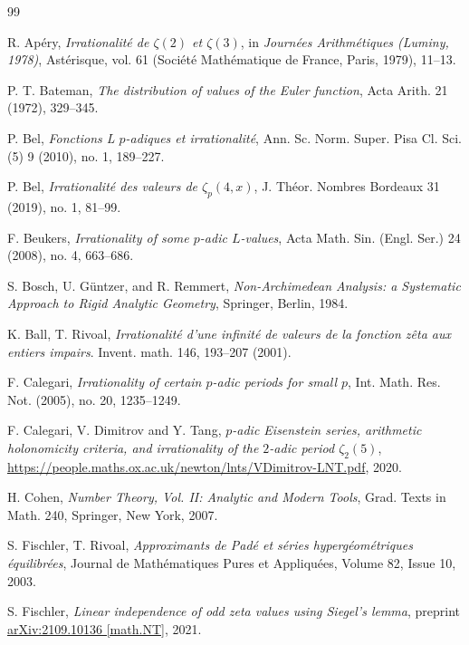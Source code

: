 \documentclass[12pt]{article}
\numberwithin{equation}{section}
\begin{document}
\begin{thebibliography}{99}

 R. Ap{\'e}ry, \textit{Irrationalit{\'e} de $\zeta(2)$ et $\zeta(3)$}, in \textit{Journ{\'e}es Arithm{\'e}tiques (Luminy, 1978)}, Ast{\'e}risque, vol. 61 (Soci{\'e}t{\'e} Math{\'e}matique de France, Paris, 1979), 11--13.

 P. T. Bateman, \textit{The distribution of values of the Euler function}, Acta Arith. 21 (1972), 329--345.

 P. Bel, \textit{Fonctions L $p$-adiques et irrationalit{\'e}}, Ann. Sc. Norm. Super. Pisa Cl. Sci. (5) 9 (2010), no. 1, 189--227.

 P. Bel, \textit{Irrationalit{\'e} des valeurs de $\zeta_p(4,x)$}, J. Th{\'e}or. Nombres Bordeaux 31 (2019), no. 1, 81--99.

 F. Beukers, \textit{Irrationality of some $p$-adic $L$-values}, Acta Math. Sin. (Engl. Ser.) 24 (2008), no. 4, 663--686.

 S. Bosch, U. G{\"u}ntzer, and R. Remmert, \textit{Non-Archimedean Analysis: a Systematic Approach to Rigid Analytic Geometry}, Springer, Berlin, 1984.

 K. Ball, T. Rivoal, \textit{Irrationalité d’une infinité de valeurs de la fonction zêta aux entiers impairs}. Invent. math. 146, 193–207 (2001).

 F. Calegari, \textit{Irrationality of certain $p$-adic periods for small $p$}, Int. Math. Res. Not. (2005), no. 20, 1235--1249.

 F. Calegari, V. Dimitrov and Y. Tang, \textit{$p$-adic Eisenstein series, arithmetic holonomicity criteria, and irrationality of the $2$-adic period $\zeta_2(5)$}, \url{https://people.maths.ox.ac.uk/newton/lnts/VDimitrov-LNT.pdf}, 2020.

 H. Cohen, \textit{Number Theory, Vol. II: Analytic and Modern Tools}, Grad. Texts in Math. 240, Springer, New York, 2007.

 S. Fischler, T. Rivoal, \textit{Approximants de Padé et séries hypergéométriques équilibrées}, Journal de Mathématiques Pures et Appliquées, Volume 82, Issue 10, 2003.

 S. Fischler, \textit{Linear independence of odd zeta values using Siegel's lemma}, preprint  \href{https://arxiv.org/abs/2109.10136}{arXiv:2109.10136 [math.NT]}, 2021.


\end{thebibliography}
\end{document}

